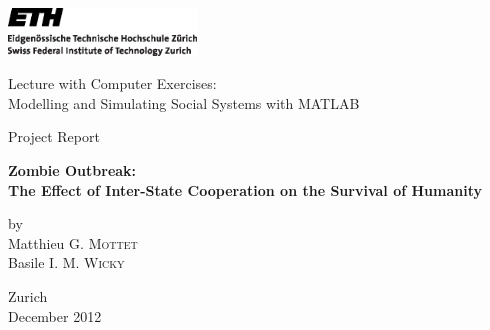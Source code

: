 
\thispagestyle{empty}

\begin{center}
\includegraphics[width=5cm]{ETHlogo.eps}

\bigskip
\bigskip
\bigskip


\LARGE{ 	Lecture with Computer Exercises:\\ }
\LARGE{ Modelling and Simulating Social Systems with MATLAB\\}

\bigskip
\bigskip
\bigskip
\bigskip

\small{Project Report}\\

\bigskip
\bigskip
\bigskip


\huge{\bf{Zombie Outbreak:\\The Effect of Inter-State Cooperation on the Survival of Humanity}}

\bigskip
\bigskip
\bigskip


\small{by\\}
\bigskip
\bigskip
\LARGE{Matthieu G. \textsc{Mottet}\\Basile I. M. \textsc{Wicky}}

\bigskip
\bigskip
\bigskip
\bigskip
\bigskip
\bigskip
\bigskip
\bigskip
\bigskip
\bigskip
\bigskip
\bigskip
\bigskip
\bigskip
\bigskip
\bigskip
\bigskip
\bigskip
Zurich\\
December 2012\\

\end{center}


